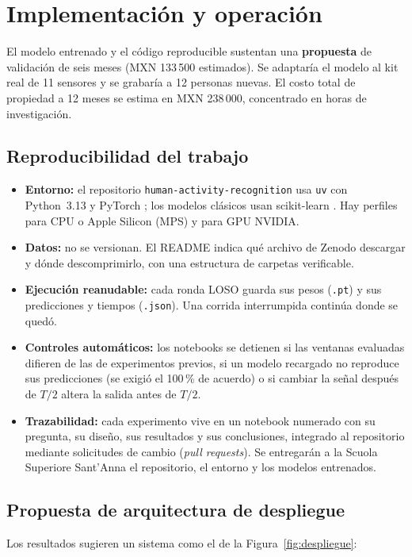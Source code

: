 \documentclass[letterpaper,11pt]{article}
\begin{document}
\section{Implementación y operación}
El modelo entrenado y el código reproducible sustentan una \textbf{propuesta} de validación de seis meses (MXN 133\,500 estimados). Se adaptaría el modelo al kit real de 11 sensores y se grabaría a 12 personas nuevas. El costo total de propiedad a 12 meses se estima en MXN 238\,000, concentrado en horas de investigación.

\subsection{Reproducibilidad del trabajo}
\begin{itemize}
  \item \textbf{Entorno:} el repositorio \texttt{human-activity-recognition} usa \texttt{uv} con Python~3.13 y PyTorch \parencite{paszke2019}; los modelos clásicos usan scikit-learn \parencite{pedregosa2011}. Hay perfiles para CPU o Apple Silicon (MPS) y para GPU NVIDIA.
  \item \textbf{Datos:} no se versionan. El README indica qué archivo de Zenodo descargar y dónde descomprimirlo, con una estructura de carpetas verificable.
  \item \textbf{Ejecución reanudable:} cada ronda LOSO guarda sus pesos (\texttt{.pt}) y sus predicciones y tiempos (\texttt{.json}). Una corrida interrumpida continúa donde se quedó.
  \item \textbf{Controles automáticos:} los notebooks se detienen si las ventanas evaluadas difieren de las de experimentos previos, si un modelo recargado no reproduce sus predicciones (se exigió el 100\,\% de acuerdo) o si cambiar la señal después de $T/2$ altera la salida antes de $T/2$.
  \item \textbf{Trazabilidad:} cada experimento vive en un notebook numerado con su pregunta, su diseño, sus resultados y sus conclusiones, integrado al repositorio mediante solicitudes de cambio (\emph{pull requests}). Se entregarán a la Scuola Superiore Sant'Anna el repositorio, el entorno y los modelos entrenados.
\end{itemize}

\subsection{Propuesta de arquitectura de despliegue}
Los resultados sugieren un sistema como el de la Figura~\ref{fig:despliegue}:
\end{document}
